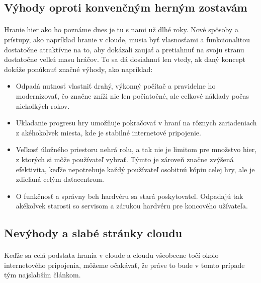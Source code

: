 \documentclass[10pt,twoside,slovak,a4paper]{article}
\begin{document}
\subsection{Výhody oproti konvenčným herným zostavám}

\paragraph{} Hranie hier ako ho poznáme dnes je tu s nami už dlhé roky. Nové spôsoby a prístupy, ako napríklad hranie v cloude, musia byť vlasnosťami a funkcionalitou dostatočne atraktívne na to, aby dokázali zaujať a pretiahnuť na svoju stranu dostatočne veľkú masu hráčov. To sa dá dosiahnuť len vtedy, ak daný koncept dokáže ponúknuť značné výhody, ako napríklad: \cite{10.1007/978-981-10-6620-7_71}

\begin{itemize}

\item Odpadá nutnosť vlastniť drahý, výkonný počítač a pravidelne ho modernizovať, čo značne zníži nie len počiatočné, ale celkové náklady počas niekoľkých rokov.

\item Ukladanie progresu hry umožňuje pokračovať v hraní na rôznych zariadeniach z akéhokoľvek miesta, kde je stabilné internetové pripojenie.

\item Veľkosť úložného priestoru nehrá rolu, a tak nie je limitom pre množstvo hier, z ktorých si môže používateľ vybrať. Týmto je zároveň značne zvýšená efektivita, keďže nepotrebuje každý používateľ osobitnú kópiu celej hry, ale je zdieľaná celým datacentrom.

\item O funkčnosť a správny beh hardvéru sa stará poskytovateľ. Odpadajú tak akékoľvek starosti so servisom a zárukou hardvéru pre koncového užívateľa.

\end{itemize}



\subsection{Nevýhody a slabé stránky cloudu}

\paragraph{} Keďže sa celá podstata hrania v cloude a cloudu všeobecne točí okolo internetového pripojenia, môžeme očakávať, že práve to bude v tomto prípade tým najslabším článkom. \cite{10.1007/978-981-10-6620-7_71}
\end{document}
